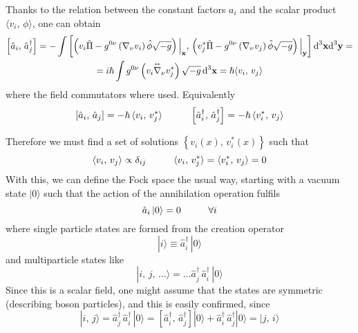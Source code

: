 Thanks to the relation between the constant factors $a_i$ and the scalar product $\langle v_i,\,\phi\rangle$, one can obtain
\begin{multline}
	\left[\hat{a}_i,\,\hat{a}_j^\dagger\right]=-\int\left[\left(v_i\hat{\Pi}-g^{0\nu}\left(\nabla_\nu v_i\right)\hat{\phi}\sqrt{-g}\right)\Big|_\mathbf{x},\,\left(v_j^*\hat{\Pi}-g^{0\nu}\left(\nabla_\nu v_j\right)\hat{\phi}\sqrt{-g}\right)\Big|_\mathbf{y}\right]\text{d}^3\mathbf{x}\text{d}^3\mathbf{y}=\\
	=i\hbar\int g^{0\nu}\left(v_i\overset{\text{\tiny$\leftrightarrow$}}{\nabla}_\nu v_j^*\right)\sqrt{-g}\,\text{d}^3\mathbf{x}=\hbar\langle v_i,\,v_j\rangle
\end{multline}
where the field commutators where used. Equivalently 
\begin{equation}
	\left[\hat{a}_i,\,\hat{a}_j\right]=-\hbar\,\langle v_i,\,v_j^*\rangle\hspace{1.0cm}\left[\hat{a}_i^\dagger,\,\hat{a}_j^\dagger\right]=-\hbar\,\langle v_i^*,\,v_j\rangle
\end{equation}

Therefore we must find a set of solutions $\left\{v_i(x),\,v_i^*(x)\right\}$ such that
\begin{equation}
	\langle v_i,\,v_j\rangle\propto \delta_{ij}\hspace{1.0cm}\langle v_i,\,v_j^*\rangle=\langle v_i^*,\,v_j\rangle=0
\end{equation}
With this, we can define the Fock space the usual way, starting with a vacuum state $|0\rangle$ such that the action of the annihilation operation fulfils
\begin{equation}
	\hat{a}_i\,|0\rangle=0\hspace{1.0cm}\forall i
\end{equation}
where single particle states are formed from the creation operator
\begin{equation}
	|i\rangle\equiv \hat{a}^\dagger_i\,|0\rangle
\end{equation}
and multiparticle states like
\begin{equation}
	|i,\,j,\,\hdots\rangle=\hdots \hat{a}_j^\dagger\,\hat{a}_i^\dagger\,|0\rangle
\end{equation}
Since this is a scalar field, one might assume that the states are symmetric (describing boson particles), and this is easily confirmed, since
\begin{equation}
	|i,\,j\rangle=\hat{a}_j^\dagger\,\hat{a}_i^\dagger\,|0\rangle=\left[\hat{a}_i^\dagger,\,\hat{a}_j^\dagger\right]|0\rangle+\hat{a}_i^\dagger\,\hat{a}_j^\dagger|0\rangle=|j,\,i\rangle
\end{equation}
